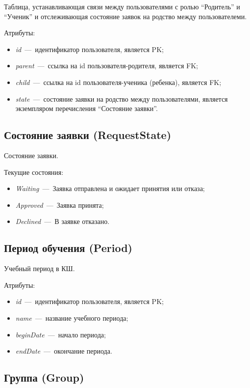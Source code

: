 \documentclass[14pt]{article}
\begin{document}
Таблица, устанавливающая связи между пользователями с ролью ``Родитель'' и ``Ученик'' и отслеживающая состояние заявок на родство между пользователеми.

Атрибуты:
\begin{itemize}
	\item \emph{id}~---~идентификатор пользователя, является PK;
	\item \emph{parent}~---~ссылка на id пользователя-родителя, является FK;
	\item \emph{child}~---~ссылка на id пользователя-ученика (ребенка), является FK;
	\item \emph{state}~---~состояние заявки на родство между пользователями, является экземпляром перечисления ``Состояние заявки''.
\end{itemize}

\subsection{Состояние заявки (RequestState)}

Состояние заявки.

Текущие состояния:
\begin{itemize}
	\item \emph{Waiting}~---~Заявка отправлена и ожидает принятия или отказа;
	\item \emph{Approved}~---~Заявка принята;
	\item \emph{Declined}~---~В заявке отказано.
\end{itemize}

\subsection{Период обучения (Period)}

Учебный период в КШ.

Атрибуты:
\begin{itemize}
	\item \emph{id}~---~идентификатор пользователя, является PK;
	\item \emph{name}~---~название учебного периода;
	\item \emph{beginDate}~---~начало периода;
	\item \emph{endDate}~---~окончание периода.
\end{itemize}

\subsection{Группа (Group)}
\end{document}

